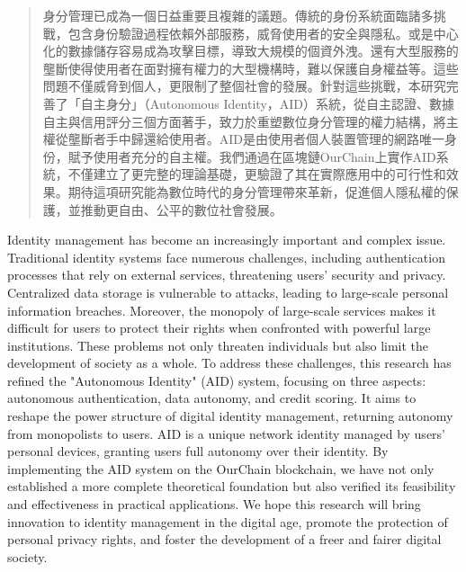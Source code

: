 
\begin{abstract}
  身分管理已成為一個日益重要且複雜的議題。傳統的身份系統面臨諸多挑戰，包含身份驗證過程依賴外部服務，威脅使用者的安全與隱私。或是中心化的數據儲存容易成為攻擊目標，導致大規模的個資外洩。還有大型服務的壟斷使得使用者在面對擁有權力的大型機構時，難以保護自身權益等。這些問題不僅威脅到個人，更限制了整個社會的發展。針對這些挑戰，本研究完善了「自主身分」（Autonomous Identity，AID）系統，從自主認證、數據自主與信用評分三個方面著手，致力於重塑數位身分管理的權力結構，將主權從壟斷者手中歸還給使用者。AID是由使用者個人裝置管理的網路唯一身份，賦予使用者充分的自主權。我們通過在區塊鏈OurChain上實作AID系統，不僅建立了更完整的理論基礎，更驗證了其在實際應用中的可行性和效果。期待這項研究能為數位時代的身分管理帶來革新，促進個人隱私權的保護，並推動更自由、公平的數位社會發展。
\end{abstract}

\begin{abstract*}
  Identity management has become an increasingly important and complex issue. Traditional identity systems face numerous challenges, including authentication processes that rely on external services, threatening users' security and privacy. Centralized data storage is vulnerable to attacks, leading to large-scale personal information breaches. Moreover, the monopoly of large-scale services makes it difficult for users to protect their rights when confronted with powerful large institutions. These problems not only threaten individuals but also limit the development of society as a whole. To address these challenges, this research has refined the "Autonomous Identity" (AID) system, focusing on three aspects: autonomous authentication, data autonomy, and credit scoring. It aims to reshape the power structure of digital identity management, returning autonomy from monopolists to users. AID is a unique network identity managed by users' personal devices, granting users full autonomy over their identity. By implementing the AID system on the OurChain blockchain, we have not only established a more complete theoretical foundation but also verified its feasibility and effectiveness in practical applications. We hope this research will bring innovation to identity management in the digital age, promote the protection of personal privacy rights, and foster the development of a freer and fairer digital society.
\end{abstract*}